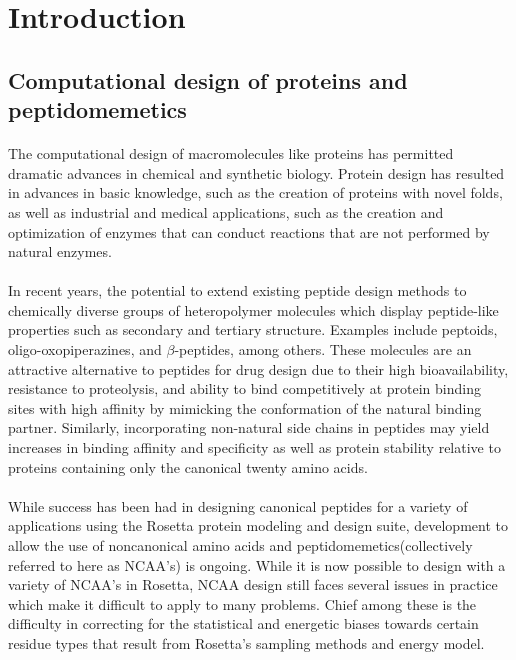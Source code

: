 \section{Introduction}
\subsection{Computational design of proteins and peptidomemetics}
\paragraph{}
The computational design of macromolecules like proteins has permitted dramatic advances in chemical and synthetic biology.
Protein design has resulted in advances in basic knowledge, such as the creation of proteins with novel folds\cite{kuhlman_design_2003}, as well as industrial and medical applications, such as the creation and optimization of enzymes that can conduct reactions that are not performed by natural enzymes\cite{jiang_denovo_2008,rothlisberger_kemp_2008}.

\paragraph{}
In recent years, the potential to extend existing peptide design methods to chemically diverse groups of heteropolymer molecules which display peptide-like properties such as secondary and tertiary structure.
Examples include peptoids\cite{renfrew_incorporation_2012}, oligo-oxopiperazines\cite{lao_rational_2014}, and $\beta$-peptides\cite{molski_remodeling_2012}, among others.
These molecules are an attractive alternative to peptides for drug design due to their high bioavailability, resistance to proteolysis, and ability to bind competitively at protein binding sites with high affinity by mimicking the conformation of the natural binding partner\cite{lao_rational_2014}.
Similarly, incorporating non-natural side chains in peptides may yield increases in binding affinity and specificity as well as protein stability relative to proteins containing only the canonical twenty amino acids\cite{horng_values_2003}.

\paragraph{}
While success has been had in designing canonical peptides for a variety of applications using the Rosetta protein modeling and design suite\cite{leaver-fay_chapter_2011,jiang_denovo_2008,rothlisberger_kemp_2008}, development to allow the use of noncanonical amino acids and peptidomemetics(collectively referred to here as NCAA's) is ongoing.
While it is now possible to design with a variety of NCAA's in Rosetta\cite{renfrew_incorporation_2012,drew_adding_2013}, NCAA design still faces several issues in practice which make it difficult to apply to many problems.
Chief among these is the difficulty in correcting for the statistical and energetic biases towards certain residue types that result from Rosetta's sampling methods and energy model.

